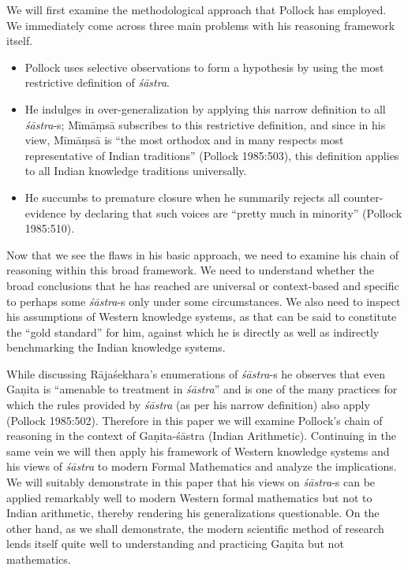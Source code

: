 We will first examine the methodological approach that Pollock has employed. We immediately come across three main problems with his reasoning framework itself. 
\begin{itemize}
\item Pollock uses selective observations to form a hypothesis by using the most restrictive definition of {\sl śāstra}.

\item He indulges in over-generalization by applying this narrow definition to all {\sl śāstra}-s; Mīmāṃsā subscribes to this restrictive definition, and since in his view, Mīmāṃsā is ``the most orthodox and in many respects most representative of Indian traditions'' (Pollock 1985:503), this definition applies to all Indian knowledge traditions universally.

\item He succumbs to premature closure when he summarily rejects all counter-evidence by declaring that such voices are ``pretty much in minority'' (Pollock 1985:510).
\end{itemize}

Now that we see the flaws in his basic approach, we need to examine his chain of reasoning within this broad framework. We need to understand whether the broad conclusions that he has reached are universal or context-based and specific to perhaps some {\sl śāstra}-s only under some circumstances.  We also need to inspect his assumptions of Western knowledge systems, as that can be said to constitute the ``gold standard'' for him, against which he is directly as well as indirectly benchmarking the Indian knowledge systems.

While discussing Rājaśekhara’s enumerations of {\sl śāstra}-s he observes that even Gaṇita is ``amenable to treatment in {\sl śāstra}'' and is one of the many practices for which the rules provided by {\sl śāstra} (as per his narrow definition) also apply (Pollock 1985:502). Therefore in this paper we will examine Pollock’s chain of reasoning in the context of Gaṇita-śāstra (Indian Arithmetic). Continuing in the same vein we will then apply his framework of Western knowledge systems and his views of {\sl śāstra} to modern Formal Mathematics and analyze the implications. We will suitably demonstrate in this paper that his views on {\sl śāstra}-s can be applied remarkably well to modern Western formal mathematics but not to Indian arithmetic, thereby rendering his generalizations questionable. On the other hand, as we shall demonstrate, the modern scientific method of research lends itself quite well to understanding and practicing Gaṇita but not mathematics.

